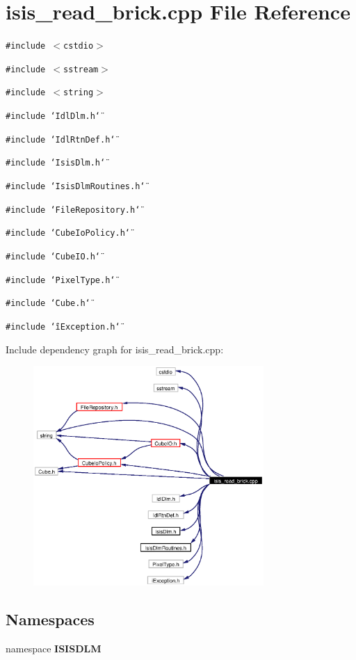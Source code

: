 \section{isis\_\-read\_\-brick.cpp File Reference}
\label{isis__read__brick_8cpp}
{\tt \#include $<$cstdio$>$}\par
{\tt \#include $<$sstream$>$}\par
{\tt \#include $<$string$>$}\par
{\tt \#include \char`\"{}Idl\-Dlm.h\char`\"{}}\par
{\tt \#include \char`\"{}Idl\-Rtn\-Def.h\char`\"{}}\par
{\tt \#include \char`\"{}Isis\-Dlm.h\char`\"{}}\par
{\tt \#include \char`\"{}Isis\-Dlm\-Routines.h\char`\"{}}\par
{\tt \#include \char`\"{}File\-Repository.h\char`\"{}}\par
{\tt \#include \char`\"{}Cube\-Io\-Policy.h\char`\"{}}\par
{\tt \#include \char`\"{}Cube\-IO.h\char`\"{}}\par
{\tt \#include \char`\"{}Pixel\-Type.h\char`\"{}}\par
{\tt \#include \char`\"{}Cube.h\char`\"{}}\par
{\tt \#include \char`\"{}i\-Exception.h\char`\"{}}\par


Include dependency graph for isis\_\-read\_\-brick.cpp:\begin{figure}[H]
\begin{center}
\leavevmode
\includegraphics[width=248pt]{isis__read__brick_8cpp__incl}
\end{center}
\end{figure}
\subsection*{Namespaces}
\begin{CompactItemize}
\item 
namespace {\bf ISISDLM}
\end{CompactItemize}
